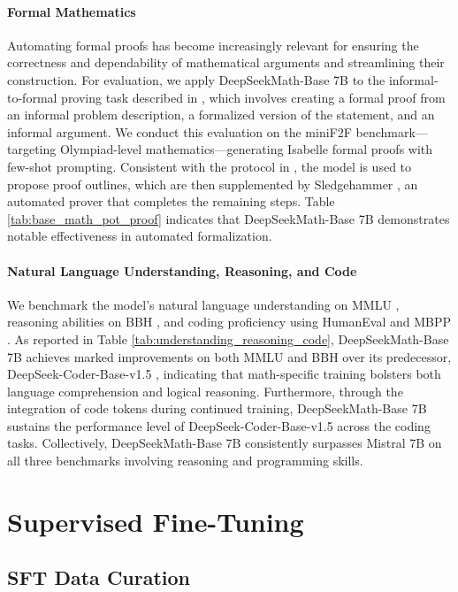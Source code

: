 \paragraph{Formal Mathematics}

Automating formal proofs has become increasingly relevant for ensuring the correctness and dependability of mathematical arguments and streamlining their construction. For evaluation, we apply DeepSeekMath-Base 7B to the informal-to-formal proving task described in \citep{dsp_proof}, which involves creating a formal proof from an informal problem description, a formalized version of the statement, and an informal argument. We conduct this evaluation on the miniF2F \citep{minif2f} benchmark—targeting Olympiad-level mathematics—generating Isabelle formal proofs with few-shot prompting. Consistent with the protocol in \cite{dsp_proof}, the model is used to propose proof outlines, which are then supplemented by Sledgehammer \citep{sledgehammer}, an automated prover that completes the remaining steps. Table \ref{tab:base_math_pot_proof} indicates that DeepSeekMath-Base 7B demonstrates notable effectiveness in automated formalization.

\paragraph{Natural Language Understanding, Reasoning, and Code}

We benchmark the model’s natural language understanding on MMLU \citep{mmlu}, reasoning abilities on BBH \citep{bbh}, and coding proficiency using HumanEval \citep{codex} and MBPP \citep{mbpp}. As reported in Table \ref{tab:understanding_reasoning_code}, DeepSeekMath-Base 7B achieves marked improvements on both MMLU and BBH over its predecessor, DeepSeek-Coder-Base-v1.5 \citep{deepseek-coder}, indicating that math-specific training bolsters both language comprehension and logical reasoning. Furthermore, through the integration of code tokens during continued training, DeepSeekMath-Base 7B sustains the performance level of DeepSeek-Coder-Base-v1.5 across the coding tasks. Collectively, DeepSeekMath-Base 7B consistently surpasses Mistral 7B \citep{mistral} on all three benchmarks involving reasoning and programming skills.

\section{Supervised Fine-Tuning}

\subsection{SFT Data Curation}

